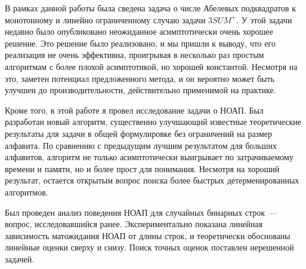 В рамках данной работы была сведена задача о числе Абелевых подквадратов к монотонному и линейно ограниченному случаю задачи $3SUM^+$. У этой задачи недавно было опубликовано неожиданное асимптотически очень хорошее решение. Это решение было реализовано, и мы пришли к выводу, что его реализация не очень эффективна, проигрывая в несколько раз простым алгоритмам с более плохой асимптотикой, но хорошей константой. Несмотря на это, заметен потенциал предложенного метода, и он вероятно может быть улучшен до производительности, действительно применимой на практике.

Кроме того, в этой работе я провел исследование задачи о НОАП. Был разработан новый алгоритм, существенно улучшающий известные теоретические результаты для задачи в общей формулировке без ограничений на размер алфавита. По сравнению с предыдущим лучшим результатом для больших алфавитов, алгоритм не только асимптотически выигрывает по затрачиваемому времени и памяти, но и более прост для понимания. Несмотря на хороший результат, остается открытым вопрос поиска более быстрых детерменированных алгоритмов.

Был проведен анализ поведения НОАП для случайных бинарных строк~--- вопрос, исследовавшийся ранее. Экспериментально показана линейная зависимость матожидания НОАП от длины строк, и теоретически обоснованы линейные оценки сверху и снизу. Поиск точных оценок поставлен нерешенной задачей.

